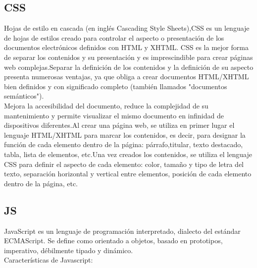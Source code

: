 \documentclass[12pt]{book}
\begin{document}
\subsection{CSS}
Hojas de estilo en cascada (en inglés Cascading Style Sheets),CSS es un lenguaje de hojas de estilos creado para controlar el aspecto o presentación de los documentos electrónicos definidos con HTML y XHTML. CSS es la mejor forma de separar los contenidos y su presentación y es imprescindible para crear páginas web complejas.Separar la definición de los contenidos y la definición de su aspecto presenta numerosas ventajas, ya que obliga a crear documentos HTML/XHTML bien definidos y con significado completo (también llamados "documentos semánticos"). \\
Mejora la accesibilidad del documento, reduce la complejidad de su mantenimiento y permite visualizar el mismo documento en infinidad de dispositivos diferentes.Al crear una página web, se utiliza en primer lugar el lenguaje HTML/XHTML para marcar los contenidos, es decir, para designar la función de cada elemento dentro de la página: párrafo,titular, texto destacado, tabla, lista de elementos, etc.Una vez creados los contenidos, se utiliza el lenguaje CSS para definir el aspecto de cada elemento: color, tamaño y tipo de letra del texto, separación horizontal y vertical entre elementos, posición de cada elemento dentro de la página, etc. \\

\subsection{JS}
JavaScript es un lenguaje de programación interpretado, dialecto del estándar ECMAScript. Se define como orientado a objetos, basado en prototipos, imperativo, débilmente tipado y dinámico. \\
Características de Javascript:
\end{document}
